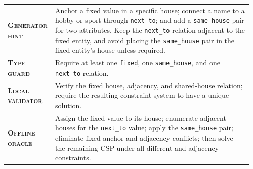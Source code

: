 \begin{table}[htbp]
\centering
\begin{minipage}{0.97\textwidth}
\raggedright
\small
\setlength{\tabcolsep}{3pt}
\renewcommand{\arraystretch}{1.16}
\vspace{0.35em}
\begin{tabular}{@{}>{\raggedright\arraybackslash\bfseries}p{0.17\linewidth} >{\raggedright\arraybackslash}p{0.79\linewidth}@{}}
    \textsc{Generator hint} & Anchor a fixed value in a specific house; connect a name to a hobby or sport through \texttt{next\_to}; and add a \texttt{same\_house} pair for two attributes. Keep the \texttt{next\_to} relation adjacent to the fixed entity, and avoid placing the \texttt{same\_house} pair in the fixed entity's house unless required. \\
    \textsc{Type guard} & Require at least one \texttt{fixed}, one \texttt{same\_house}, and one \texttt{next\_to} relation. \\
    \textsc{Local validator} & Verify the fixed house, adjacency, and shared-house relation; require the resulting constraint system to have a unique solution. \\
    \textsc{Offline oracle} & Assign the fixed value to its house; enumerate adjacent houses for the \texttt{next\_to} value; apply the \texttt{same\_house} pair; eliminate fixed-anchor and adjacency conflicts; then solve the remaining CSP under all-different and adjacency constraints. \\
\end{tabular}
\vspace{0.45em}
\end{minipage}
\end{table}

